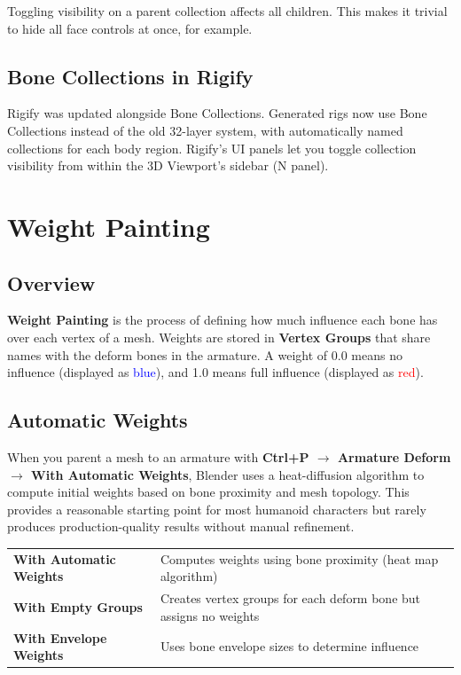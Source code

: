 Toggling visibility on a parent collection affects all children. This makes it trivial to hide all face controls at once, for example.

\subsection{Bone Collections in Rigify}

Rigify was updated alongside Bone Collections. Generated rigs now use Bone Collections instead of the old 32-layer system, with automatically named collections for each body region. Rigify's UI panels let you toggle collection visibility from within the 3D Viewport's sidebar (N panel).


\section{Weight Painting}
\label{sec:weight-painting}

\subsection{Overview}

\textbf{Weight Painting} is the process of defining how much influence each bone has over each vertex of a mesh. Weights are stored in \textbf{Vertex Groups} that share names with the deform bones in the armature. A weight of 0.0 means no influence (displayed as \textcolor{blue}{blue}), and 1.0 means full influence (displayed as \textcolor{red}{red}).

\subsection{Automatic Weights}

When you parent a mesh to an armature with \textbf{Ctrl+P $\rightarrow$ Armature Deform $\rightarrow$ With Automatic Weights}, Blender uses a heat-diffusion algorithm to compute initial weights based on bone proximity and mesh topology. This provides a reasonable starting point for most humanoid characters but rarely produces production-quality results without manual refinement.

\begin{center}
\begin{tabularx}{\textwidth}{L{4cm}X}
\toprule
{}
 &  \\
\midrule
\textbf{With Automatic Weights} & Computes weights using bone proximity (heat map algorithm) \\
\textbf{With Empty Groups} & Creates vertex groups for each deform bone but assigns no weights \\
\textbf{With Envelope Weights} & Uses bone envelope sizes to determine influence \\
\bottomrule
\end{tabularx}
\end{center}

